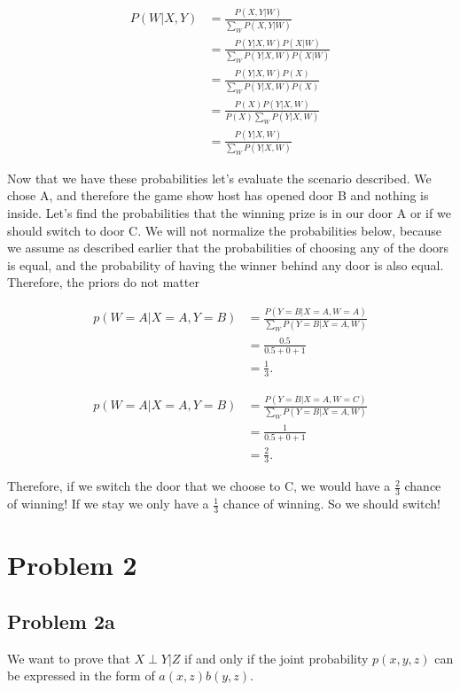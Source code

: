 \documentclass[paper=a4, fontsize=11pt]{scrartcl} %
\begin{document}
\begin{align}
P(W|X,Y) &= \frac{P(X,Y|W)}{\sum_W P(X,Y|W)} \\
&= \frac{P(Y|X,W)P(X|W)}{\sum_W P(Y|X,W)P(X|W)} \\
&= \frac{P(Y|X,W)P(X)}{\sum_W P(Y|X,W)P(X)} \\
&= \frac{P(X)P(Y|X,W)}{P(X) \sum_W P(Y|X,W)} \\
&= \frac{P(Y|X,W)}{ \sum_W P(Y|X,W)} 
\end{align}

Now that we have these probabilities let's evaluate the scenario described.
We chose A, and therefore the game show host has opened door B and nothing is inside.
Let's find the probabilities that the winning prize is in our door A or if we should switch to door C.
We will not normalize the probabilities below, because we assume as described earlier that the probabilities of choosing any of the doors is equal, and the probability of having the winner behind any door is also equal.  Therefore, the priors do not matter

\begin{align}
p(W=A|X=A, Y=B) &= \frac{P(Y=B|X=A,W=A)}{ \sum_W P(Y=B|X=A,W)} \\
&= \frac{0.5}{0.5+0+1}  \\
&= \frac{1}{3}.
\end{align}

\begin{align}
p(W=A|X=A, Y=B) &=\frac{P(Y=B|X=A,W=C)}{ \sum_W P(Y=B|X=A,W)} \\
&= \frac{1}{0.5+0+1}  \\
&= \frac{2}{3}.
\end{align}

Therefore, if we switch the door that we choose to C, we would have a $\frac{2}{3}$ chance of winning!  
If we stay we only have a $\frac{1}{3}$ chance of winning.
So we should switch!


\section{Problem 2}
\subsection{Problem 2a}
We want to prove that $X \perp Y|Z$ if and only if the joint probability $p(x,y,z)$ can be expressed in the form of $a(x,z)b(y,z)$.
\end{document}
